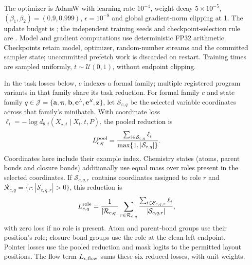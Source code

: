 The optimizer is AdamW with learning rate $10^{-4}$, weight decay $5\times10^{-5}$,
$(\beta_1,\beta_2)=(0.9,0.999)$, $\epsilon=10^{-8}$ and global gradient-norm clipping at 1.
The update budget is ; the independent training seeds and
checkpoint-selection rule are . Model and gradient
computations use deterministic FP32 arithmetic. Checkpoints retain model, optimizer, random-number
streams and the committed sampler state; uncommitted prefetch work is discarded on restart.
Training times are sampled uniformly, $t\sim\mathcal U(0,1)$, without endpoint clipping.

In the task losses below, $c$ indexes a formal family; multiple registered program variants in that
family share its task reduction.
For formal family $c$ and state family
$q\in\mathscr J=\{\mathbf a,\boldsymbol\pi,\mathbf b,\mathbf e^L,\mathbf e^R,\mathbf z\}$,
let $\mathcal S_{c,q}$ be the selected variable coordinates across that family's minibatch.
With coordinate loss $\ell_i=-\log d_{\theta,i}(X_{\star,i}\mid X_t,t,P)$, the pooled reduction is
\begin{equation}
 L_{c,q}^{\rm pool}=\frac{\sum_{i\in\mathcal S_{c,q}}\ell_i}{\max\{1,|\mathcal S_{c,q}|\}}.
\end{equation}
Coordinates here include their example index. Chemistry states (atoms, parent bonds and closure
bonds) additionally use equal mass over roles present in the selected coordinates. If
$\mathcal S_{c,q,r}$ contains coordinates assigned to role $r$ and
$\mathcal R_{c,q}=\{r:|\mathcal S_{c,q,r}|>0\}$, this reduction is
\begin{equation}
 L_{c,q}^{\rm role}=\frac{1}{|\mathcal R_{c,q}|}
 \sum_{r\in\mathcal R_{c,q}}\frac{\sum_{i\in\mathcal S_{c,q,r}}\ell_i}{|\mathcal S_{c,q,r}|},
 \label{eq:role-balanced-loss}
\end{equation}
with zero loss if no role is present. Atom and parent-bond groups use their position's role;
closure-bond groups use the role at the clean left endpoint. Pointer losses use the pooled reduction
and mask logits to the permitted layout positions. The flow term $L_{c,\rm flow}$ sums these six
reduced losses, with unit weights.

